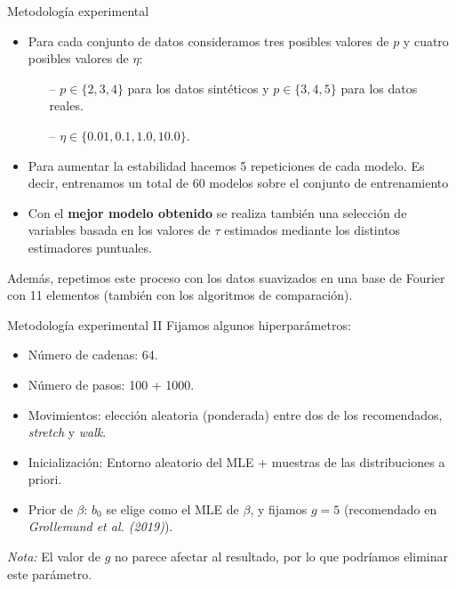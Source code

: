 \documentclass[10pt, spanish, professionalfonts]{beamer}
\begin{document}
\begin{frame}{Metodología experimental}
  \begin{itemize}
  \item Para cada conjunto de datos consideramos tres posibles valores de \(p\) y cuatro posibles valores de \(\eta\):
  \begin{itemize}
    \item[--] \(p\in \{2,3,4\}\) para los datos sintéticos y \(p\in \{3, 4, 5\}\) para los datos reales.
      \item[--] \(\eta \in \{0.01, 0.1, 1.0, 10.0\}\).
  \end{itemize}

  \item Para aumentar la estabilidad hacemos 5 repeticiones de cada modelo. Es decir, entrenamos un total de 60 modelos sobre el conjunto de entrenamiento

  \item Con el \textbf{mejor modelo obtenido} se realiza también una selección de variables basada en los valores de \(\tau\) estimados mediante los distintos estimadores puntuales.
\end{itemize}

Además, repetimos este proceso con los datos suavizados en una base de Fourier con 11 elementos (también con los algoritmos de comparación).
\end{frame}

\begin{frame}{Metodología experimental II}
  Fijamos algunos hiperparámetros:
  \begin{itemize}
    \item Número de cadenas: 64.
    \item Número de pasos: 100 + 1000.
    \item Movimientos: elección aleatoria (ponderada) entre dos de los recomendados, \textit{stretch} y \textit{walk}.
    \item Inicialización: Entorno aleatorio del MLE + muestras de las distribuciones a priori.
    \item Prior de \(\beta\): \(b_0\) se elige como el MLE de \(\beta\), y fijamos \(g=5\) (recomendado en \textit{Grollemund et al. (2019)}).
  \end{itemize}
  \vspace{1em}

  \textit{Nota:} El valor de \(g\) no parece afectar al resultado, por lo que podríamos eliminar este parámetro.
\end{frame}
\end{document}
